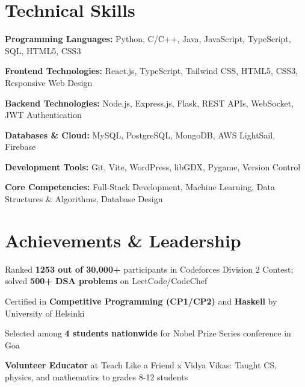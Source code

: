 \documentclass[letterpaper,10pt]{article}
\newcommand{\heading}[2]{
  \hspace{10pt}#1\hfill#2\\
}
\newcommand{\headingBf}[2]{
  \heading{\textbf{#1}}{\textbf{#2}}
}
\newenvironment{resume_list}{
  \vspace{-7pt}
  \begin{itemize}[itemsep=-2px, parsep=1pt, leftmargin=30pt]
}{
  \end{itemize}
}
\begin{document}
  

  \section{Technical Skills}

  \begin{resume_list}
    \item \textbf{Programming Languages:} Python, C/C++, Java, JavaScript, TypeScript, SQL, HTML5, CSS3
    \item \textbf{Frontend Technologies:} React.js, TypeScript, Tailwind CSS, HTML5, CSS3, Responsive Web Design
    \item \textbf{Backend Technologies:} Node.js, Express.js, Flask, REST APIs, WebSocket, JWT Authentication
    \item \textbf{Databases \& Cloud:} MySQL, PostgreSQL, MongoDB, AWS LightSail, Firebase
    \item \textbf{Development Tools:} Git, Vite, WordPress, libGDX, Pygame, Version Control
    \item \textbf{Core Competencies:} Full-Stack Development, Machine Learning, Data Structures \& Algorithms, Database Design
  \end{resume_list}


  \section{Achievements \& Leadership}

  \begin{resume_list}
    \item Ranked \textbf{1253 out of 30,000+} participants in Codeforces Division 2 Contest; solved \textbf{500+ DSA problems} on LeetCode/CodeChef
    \item Certified in \textbf{Competitive Programming (CP1/CP2)} and \textbf{Haskell} by University of Helsinki
    \item Selected among \textbf{4 students nationwide} for Nobel Prize Series conference in Goa
    \item \textbf{Volunteer Educator} at Teach Like a Friend x Vidya Vikas: Taught CS, physics, and mathematics to grades 8-12 students
  \end{resume_list}
\end{document}
